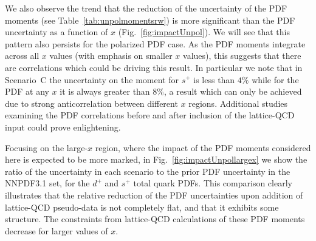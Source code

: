 We also observe the trend that the reduction of the uncertainty 
of the PDF moments (see Table~\ref{tab:unpolmomentsrw})
is more significant than the PDF uncertainty as a function of $x$  
(Fig.~\ref{fig:impactUnpol}).
%
We will see that this pattern also persists for the polarized PDF case.
%
As the PDF moments integrate across all $x$ values (with emphasis on 
smaller $x$ values), this suggests that there are correlations which could be 
driving this result.
%
In particular we note that in Scenario~C the uncertainty on the moment for 
$s^+$ is less than $4\%$ while for the PDF at any $x$ it is always greater 
than  $8\%$, a result which can only be achieved due to strong anticorrelation
between different $x$ regions. 
% 
Additional studies examining the PDF correlations before and after inclusion 
of the lattice-QCD input could prove enlightening. 

Focusing on the large-$x$ region, where the
impact of the PDF moments considered here is expected to be more marked, in
Fig.~\ref{fig:impactUnpollargex} we show the ratio 
of the uncertainty in each scenario to the prior PDF 
uncertainty in the NNPDF3.1 set, for the $d^+$
and $s^+$ total quark PDFs.
%
This comparison clearly illustrates that the relative reduction
of the PDF uncertainties upon addition of lattice-QCD
pseudo-data is not completely flat, and that it exhibits some structure.
%
The constraints from lattice-QCD calculations of these 
PDF moments decrease for larger values of $x$.

